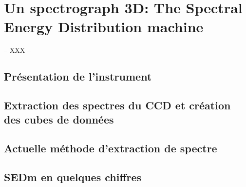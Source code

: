 \documentclass[../main/main.tex]{subfiles}
\begin{document}
\chapter{Un spectrograph 3D: The Spectral Energy Distribution machine}\label{ch:obs}

-- XXX --

\minitoc
\newpage

\section{Présentation de l'instrument}

\section{Extraction des spectres du CCD et création des cubes de données}

\section{Actuelle méthode d'extraction de spectre}

\section{SEDm en quelques chiffres}
\end{document}
